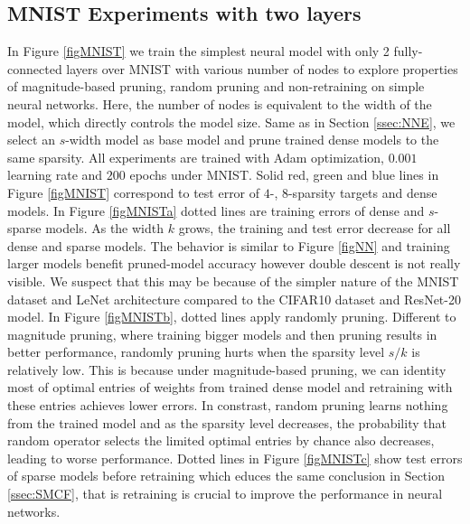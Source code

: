 \subsection{MNIST Experiments with two layers} 
In Figure \ref{figMNIST} we train the simplest neural model with only 2 fully-connected layers over MNIST with various number of nodes to explore properties of magnitude-based pruning, random pruning and non-retraining on simple neural networks. Here, the number of nodes is equivalent to the width of the model, which directly controls the model size. Same as in Section \ref{ssec:NNE}, we select an $s$-width model as base model and prune trained dense models to the same sparsity. All experiments are trained with Adam optimization, $0.001$ learning rate and $200$ epochs under MNIST.  Solid red, green and blue lines in Figure \ref{figMNIST} correspond to test error of $4$-, $8$-sparsity targets and dense models. In Figure \ref{figMNISTa} dotted lines are training errors of dense and $s$-sparse models. As the width $k$ grows, the training and test error decrease for all dense and sparse models. The behavior is similar to Figure \ref{figNN} and training larger models benefit pruned-model accuracy however double descent is not really visible. We suspect that this may be because of the simpler nature of the MNIST dataset and LeNet architecture compared to the CIFAR10 dataset and ResNet-20 model. In Figure \ref{figMNISTb}, dotted lines apply randomly pruning. Different to magnitude pruning, where training bigger models and then pruning results in better performance, randomly pruning hurts when the sparsity level $s/k$ is relatively low. This is because under magnitude-based pruning, we can identity most of optimal entries of weights from trained dense model and retraining with these entries achieves lower errors. In constrast, random pruning learns nothing from the trained model and as the sparsity level decreases, the probability that random operator selects the limited optimal entries by chance also decreases, leading to worse performance. Dotted lines in Figure \ref{figMNISTc} show test errors of sparse models before retraining which educes the same conclusion in Section \ref{ssec:SMCF}, that is retraining is crucial to improve the performance in neural networks. 


